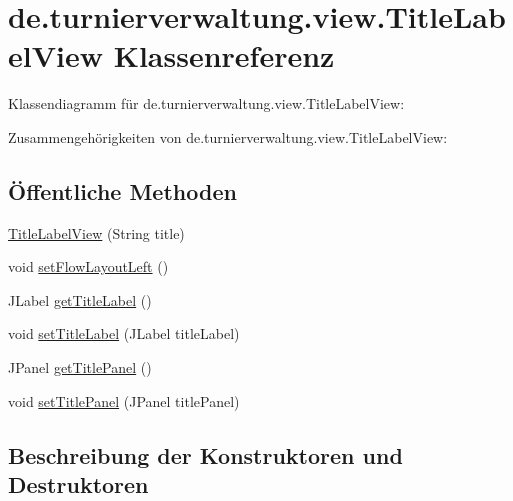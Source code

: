 \hypertarget{classde_1_1turnierverwaltung_1_1view_1_1_title_label_view}{}\section{de.\+turnierverwaltung.\+view.\+Title\+Label\+View Klassenreferenz}
\label{classde_1_1turnierverwaltung_1_1view_1_1_title_label_view}


Klassendiagramm für de.\+turnierverwaltung.\+view.\+Title\+Label\+View\+:


Zusammengehörigkeiten von de.\+turnierverwaltung.\+view.\+Title\+Label\+View\+:
\subsection*{Öffentliche Methoden}
\begin{DoxyCompactItemize}
\item 
\hyperlink{classde_1_1turnierverwaltung_1_1view_1_1_title_label_view_ae0ea2030f669c00bab8afd82e927c151}{Title\+Label\+View} (String title)
\item 
void \hyperlink{classde_1_1turnierverwaltung_1_1view_1_1_title_label_view_a56a3ff5bb1f16bc89aa054a26c266907}{set\+Flow\+Layout\+Left} ()
\item 
J\+Label \hyperlink{classde_1_1turnierverwaltung_1_1view_1_1_title_label_view_a19c65645b6e2c253585a89f51a33047b}{get\+Title\+Label} ()
\item 
void \hyperlink{classde_1_1turnierverwaltung_1_1view_1_1_title_label_view_a5e1b9dace3cde0ae8ab71f9727a4266c}{set\+Title\+Label} (J\+Label title\+Label)
\item 
J\+Panel \hyperlink{classde_1_1turnierverwaltung_1_1view_1_1_title_label_view_a4029b1585c947b0fa5a740e71cd72357}{get\+Title\+Panel} ()
\item 
void \hyperlink{classde_1_1turnierverwaltung_1_1view_1_1_title_label_view_a35238271744850af79b1956032db854a}{set\+Title\+Panel} (J\+Panel title\+Panel)
\end{DoxyCompactItemize}


\subsection{Beschreibung der Konstruktoren und Destruktoren}
